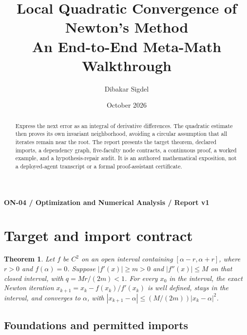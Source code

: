 \documentclass[preprint,12pt,aps,pra,showkeys,amsmath,amssymb,superscriptaddress,floatfix]{revtex4-2}
\newtheorem{theorem}{Theorem}[section]
\theoremstyle{definition}
\theoremstyle{remark}
\begin{document}
\title{Local Quadratic Convergence of Newton's Method\\[4pt]\large An End-to-End Meta-Math Walkthrough}

\author{Dibakar Sigdel}


\date{October 2026}

\begin{abstract}

Express the next error as an integral of derivative differences. The
quadratic estimate then proves its own invariant neighborhood, avoiding
a circular assumption that all iterates remain near the root. The report
presents the target theorem, declared imports, a dependency graph,
five-faculty node contracts, a continuous proof, a worked example, and a
hypothesis-repair audit. It is an authored mathematical exposition, not
a deployed-agent transcript or a formal proof-assistant certificate.

\end{abstract}\maketitle\linespread{1.12}\selectfont

\noindent\textbf{ON-04 / Optimization and Numerical Analysis / Report v1}

\section{Target and import contract}

\begin{theorem}

Let \(f\) be \(C^2\) on an open interval containing
\([\alpha-r,\alpha+r]\), where \(r>0\) and \(f(\alpha)=0\). Suppose
\(|f'(x)|\ge m>0\) and \(|f''(x)|\le M\) on that closed interval, with
\(q=Mr/(2m)<1\). For every \(x_0\) in the interval, the exact Newton
iteration \(x_{k+1}=x_k-f(x_k)/f'(x_k)\) is well defined, stays in the
interval, and converges to \(\alpha\), with
\(|x_{k+1}-\alpha|\le (M/(2m))|x_k-\alpha|^2\).

\end{theorem}

\subsection{Foundations and permitted imports}
\end{document}
